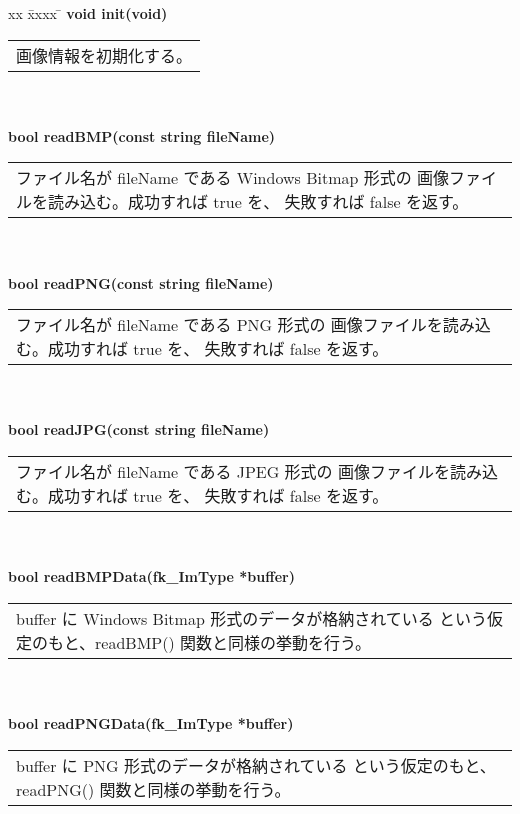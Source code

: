 \begin{tabbing}
xx \= xxxx \= \kill
\> \textbf{void init(void)} \\
	\> \> \begin{tabular}{p{15cm}}
		画像情報を初期化する。
	\end{tabular} \\ \\

\> \textbf{bool readBMP(const string fileName)} \\
	\> \> \begin{tabular}{p{15cm}}
		ファイル名が fileName である Windows Bitmap 形式の
		画像ファイルを読み込む。成功すれば true を、
		失敗すれば false を返す。
	\end{tabular} \\ \\

\> \textbf{bool readPNG(const string fileName)} \\
	\> \> \begin{tabular}{p{15cm}}
		ファイル名が fileName である PNG 形式の
		画像ファイルを読み込む。成功すれば true を、
		失敗すれば false を返す。
	\end{tabular} \\ \\

\> \textbf{bool readJPG(const string fileName)} \\
	\> \> \begin{tabular}{p{15cm}}
		ファイル名が fileName である JPEG 形式の
		画像ファイルを読み込む。成功すれば true を、
		失敗すれば false を返す。
	\end{tabular} \\ \\

\> \textbf{bool readBMPData(fk\_ImType *buffer)} \\
	\> \> \begin{tabular}{p{15cm}}
		buffer に Windows Bitmap 形式のデータが格納されている
		という仮定のもと、readBMP() 関数と同様の挙動を行う。
	\end{tabular} \\ \\

\> \textbf{bool readPNGData(fk\_ImType *buffer)} \\
	\> \> \begin{tabular}{p{15cm}}
		buffer に PNG 形式のデータが格納されている
		という仮定のもと、readPNG() 関数と同様の挙動を行う。
	\end{tabular} \\ \\


\end{tabbing}

